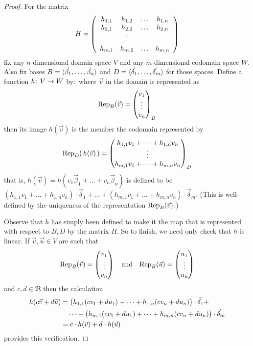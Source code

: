 \begin{proof}
For the matrix
\begin{equation*}
  H=\generalmatrix{h}{n}{m}
\end{equation*}
fix any \( n \)-dimensional domain space $V$ and  any
\( m \)-dimensional codomain space $W$.
Also fix bases
\( B=\sequence{\vec{\beta}_1,\dots,\vec{\beta}_n} \) and
\( D=\sequence{\vec{\delta}_1,\dots,\vec{\delta}_m} \) for those spaces.
Define a function \( \map{h}{V}{W} \) by:~where $\vec{v}$ in the domain
is represented as 
\begin{equation*}
  \rep{\vec{v}}{B}
    =\colvec{v_1 \\ \vdots \\ v_n}_B
\end{equation*}
then its image \( h(\vec{v}) \) is the member the codomain represented by
\begin{equation*}
  \rep{\,h(\vec{v})\,}{D}
    =\colvec{h_{1,1}v_1+\dots+h_{1,n}v_n \\ \vdots \\ 
                   h_{m,1}v_1+\dots+h_{m,n}v_n}_D
\end{equation*}
that is,
$h(\vec{v})=h(v_1\vec{\beta}_1+\dots+v_n\vec{\beta}_n)$ is defined to be 
$(h_{1,1}v_1+\dots+h_{1,n}v_n)\cdot\vec{\delta}_1
  +\dots+
  (h_{m,1}v_1+\dots+h_{m,n}v_n)\cdot\vec{\delta}_m$.
(This is well-defined by the uniqueness of the representation  
\( \rep{\vec{v}}{B} \).)

Observe that \( h \) has simply been defined to make it the map that is
represented with respect to \( B,D \) by the matrix \( H \).
So to finish, we need only check that \( h \) is linear.
If $\vec{v}, \vec{u}\in V$ are such that
\begin{equation*}
  \rep{\vec{v}}{B}=\colvec{v_1 \\ \vdots \\ v_n}
    \quad\text{and}\quad
  \rep{\vec{u}}{B}=\colvec{u_1 \\ \vdots \\ u_n}
\end{equation*}
and \( c,d\in\Re \) then the calculation
\begin{align*}
  h(c\vec{v}+d\vec{u})
  &=\bigl(h_{1,1}(cv_1+du_1)+\dots+
          h_{1,n}(cv_n+du_n)\bigr)\cdot\vec{\delta}_1+  \\
  & \hbox{}\quad\cdots+\bigl(h_{m,1}(cv_1+du_1)+\dots
         +h_{m,n}(cv_n+du_n)\bigr)\cdot\vec{\delta}_m  \\
  &=c\cdot h(\vec{v})+d\cdot h(\vec{u})
\end{align*}
provides this verification.
\end{proof}

